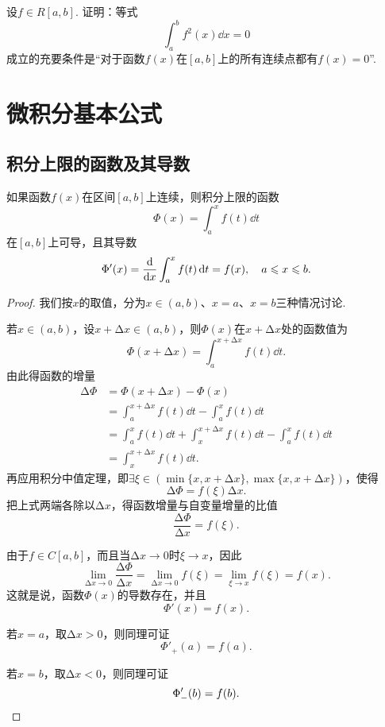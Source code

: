 \begin{example}
设\(f \in R[a,b]\).
证明：等式\[
\int_a^b f^2(x) \dd{x} = 0
\]成立的充要条件是“对于函数\(f(x)\)在\([a,b]\)上的所有连续点都有\(f(x)=0\)”.
\end{example}

\section{微积分基本公式}
\subsection{积分上限的函数及其导数}
\begin{theorem}[变限积分可导定理]\label{theorem:定积分.变限积分可导定理}
如果函数\(f(x)\)在区间\([a,b]\)上连续，则积分上限的函数\[
\Phi(x) = \int_a^x{f(t)\dd{t}}
\]在\([a,b]\)上可导，且其导数\[
\Phi'(x) = \dv{x} \int_a^x{f(t)\dd{t}} = f(x),
\quad a \leqslant x \leqslant b.
\]
\begin{proof}
我们按\(x\)的取值，分为\(x\in(a,b)\)、\(x=a\)、\(x=b\)三种情况讨论.

若\(x\in(a,b)\)，设\(x + \increment x \in (a,b)\)，则\(\Phi(x)\)在\(x + \increment x\)处的函数值为\[
\Phi(x + \increment x) = \int_a^{x+\increment x} f(t) \dd{t}.
\]由此得函数的增量\begin{align*}
\increment\Phi
&= \Phi(x + \increment x) - \Phi(x) \\
&= \int_a^{x+\increment x} f(t) \dd{t} - \int_a^x f(t) \dd{t} \\
&= \int_a^x f(t) \dd{t} + \int_x^{x+\increment x} f(t) \dd{t} - \int_a^x f(t) \dd{t} \\
&= \int_x^{x+\increment x} f(t) \dd{t}.
\end{align*}
再应用积分中值定理，即\(\exists\xi\in( \min\{x,x+\increment x\}, \max\{x,x+\increment x\} )\)，使得\[
\increment\Phi = f(\xi) \increment x.
\]把上式两端各除以\(\increment x\)，得函数增量与自变量增量的比值\[
\frac{\increment\Phi}{\increment x} = f(\xi).
\]

由于\(f \in C[a,b]\)，而且当\(\increment x\to0\)时\(\xi \to x\)，因此\[
\lim\limits_{\increment x\to0} \frac{\increment\Phi}{\increment x}
= \lim\limits_{\increment x\to0} f(\xi)
= \lim\limits_{\xi \to x} f(\xi)
= f(x).
\]
这就是说，函数\(\Phi(x)\)的导数存在，并且\[
\Phi'(x) = f(x).
\]

若\(x = a\)，取\(\increment x > 0\)，则同理可证
\[
\Phi'_+(a)=f(a).
\]

若\(x = b\)，取\(\increment x < 0\)，则同理可证
\[
\Phi'_-(b)=f(b).
\qedhere
\]
\end{proof}
\end{theorem}
